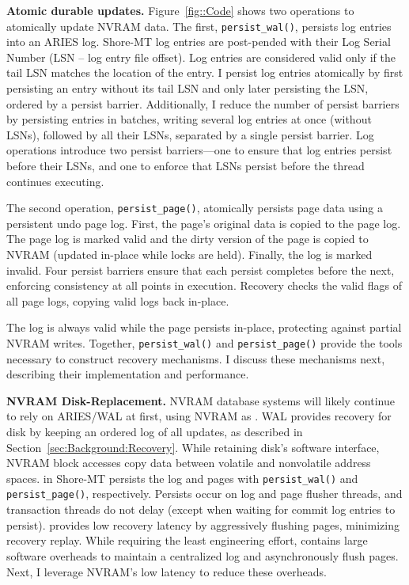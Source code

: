 
\textbf{Atomic durable updates.}
Figure~\ref{fig::Code} shows two operations to atomically update NVRAM data.
The first, \texttt{persist\_wal()}, persists log entries into an ARIES log.
Sho\-re-MT log entries are post-pended with their Log Serial Number (LSN -- log entry file offset).
Log entries are considered valid only if the tail LSN matches the location of the entry.
I persist log entries atomically by first persisting an entry without its tail LSN and only later persisting the LSN, ordered by a persist barrier.
Additionally, I reduce the number of persist barriers by persisting entries in batches, writing several log entries at once (without LSNs), followed by all their LSNs, separated by a single persist barrier.
Log operations introduce two persist barriers---one to ensure that log entries persist before their LSNs, and one to enforce that LSNs persist before the thread continues executing.

The second operation, \texttt{persist\_page()}, atomically persists page data using a persistent undo page log.
First, the page's original data is copied to the page log.
The page log is marked valid and the dirty version of the page is copied to NVRAM (updated in-place while locks are held).
Finally, the log is marked invalid.
Four persist barriers ensure that each persist completes before the next, enforcing consistency at all points in execution.
Recovery checks the valid flags of all page logs, copying valid logs back in-place.

The log is always valid while the page persists in-place, protecting against partial NVRAM writes.
Together, \texttt{persist\_wal()} and \texttt{persist\_page()} provide the tools necessary to construct recovery mechanisms.
I discuss these mechanisms next, describing their implementation and performance.

\textbf{NVRAM Disk-Replacement.}
NVRAM database systems will likely continue to rely on ARIES/WAL at first, using NVRAM as \NVDisk.
WAL provides recovery for disk by keeping an ordered log of all updates, as described in Section~\ref{sec:Background:Recovery}.
While retaining disk's software interface, NVRAM block accesses copy data between volatile and nonvolatile address spaces.
\NVDisk in Shore-MT persists the log and pages with \texttt{persist\_wal()} and \texttt{persist\_page()}, respectively.
Persists occur on log and page flusher threads, and transaction threads do not delay (except when waiting for commit log entries to persist).
\NVDisk provides low recovery latency by aggressively flushing pages, minimizing recovery replay.
While requiring the least engineering effort, \NVDisk contains large software overheads to maintain a centralized log and asynchronously flush pages.
Next, I leverage NVRAM's low latency to reduce these overheads.


